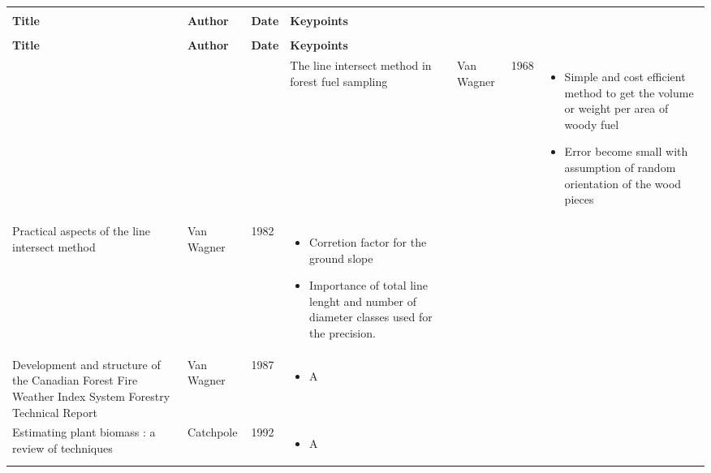\documentclass[12pt]{article}
\begin{document}
\begin{center}

\begin{longtable}{|p{4.5cm}|p{2cm}|p{0.8cm}|p{7.5cm}|}

\hline
 & & & \tabularnewline
\textbf{Title} & \textbf{Author} & \textbf{Date} & \textbf{Keypoints} \tabularnewline
 & & & \endfirsthead
 \hline
 
 \hline
 & & & \tabularnewline
\textbf{Title} & \textbf{Author} & \textbf{Date} & \textbf{Keypoints} \tabularnewline
 & & & \endhead
 \hline
 
 \hline
\endlastfoot
 \hline
 
 \hline
\endfoot
 \hline
 
\raggedright The line intersect method in forest fuel sampling & Van Wagner & 1968 & \raggedleft 
\begin{itemize} 
\item Simple and cost efficient method to get the volume or weight per area of woody fuel
\item Error become small with assumption of random orientation of the wood pieces
\end{itemize} 
\tabularnewline

\hline 


\raggedright Practical aspects of the line intersect method & Van Wagner & 1982 & \raggedleft 
\begin{itemize} 
\item Corretion factor for the ground slope
\item Importance of total line lenght and number of diameter classes used for the precision.
\end{itemize} 
\tabularnewline

\hline


\raggedright Development and structure of the Canadian Forest Fire Weather Index System Forestry Technical Report & Van Wagner& 1987 & \raggedleft 
\begin{itemize} 
\item A
\end{itemize} 
\tabularnewline

\hline

\raggedright Estimating plant biomass : a review of techniques & Catchpole& 1992 & \raggedleft 
\begin{itemize} 
\item A
\end{itemize} 
\tabularnewline

\hline




\end{longtable}
\end{center}
\end{document}
